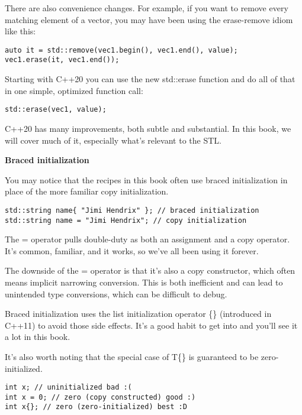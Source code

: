 There are also convenience changes. For example, if you want to remove every matching element of a vector, you may have been using the erase-remove idiom like this:

\begin{lstlisting}[style=styleCXX]
auto it = std::remove(vec1.begin(), vec1.end(), value);
vec1.erase(it, vec1.end());
\end{lstlisting}

Starting with C++20 you can use the new std::erase function and do all of that in one simple, optimized function call:

\begin{lstlisting}[style=styleCXX]
std::erase(vec1, value);
\end{lstlisting}

C++20 has many improvements, both subtle and substantial. In this book, we will cover much of it, especially what's relevant to the STL.

\noindent
\textbf{Braced initialization}

You may notice that the recipes in this book often use braced initialization in place of the more familiar copy initialization.

\begin{lstlisting}[style=styleCMake]
std::string name{ "Jimi Hendrix" }; // braced initialization
std::string name = "Jimi Hendrix"; // copy initialization
\end{lstlisting}

The = operator pulls double-duty as both an assignment and a copy operator. It's common, familiar, and it works, so we've all been using it forever.

The downside of the = operator is that it's also a copy constructor, which often means implicit narrowing conversion. This is both inefficient and can lead to unintended type conversions, which can be difficult to debug.

Braced initialization uses the list initialization operator \{\} (introduced in C++11) to avoid those side effects. It's a good habit to get into and you'll see it a lot in this book.

It's also worth noting that the special case of T\{\} is guaranteed to be zero-initialized.

\begin{lstlisting}[style=styleCXX]
int x; // uninitialized bad :(
int x = 0; // zero (copy constructed) good :)
int x{}; // zero (zero-initialized) best :D
\end{lstlisting}

